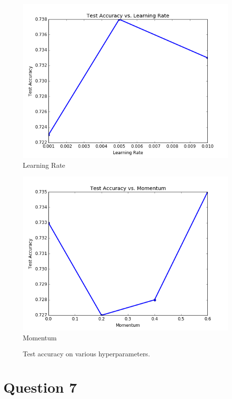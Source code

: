 \documentclass[paper=a4, fontsize=11pt]{scrartcl}
\begin{document}
\begin{figure}
\begin{minipage}{.5\textwidth}
  	\includegraphics[width=1\linewidth]{learningrate.png}
  	\footnotesize{Learning Rate}
 \end{minipage}%
\centering
 \begin{minipage}{.5\textwidth}
 \centering
  	\includegraphics[width=1\linewidth]{momentum.png}
  	\footnotesize{Momentum}
 \end{minipage}
\caption{Test accuracy on various hyperparameters.}
\label{fig:question6}
\end{figure}

\section{Question 7}
\end{document}
